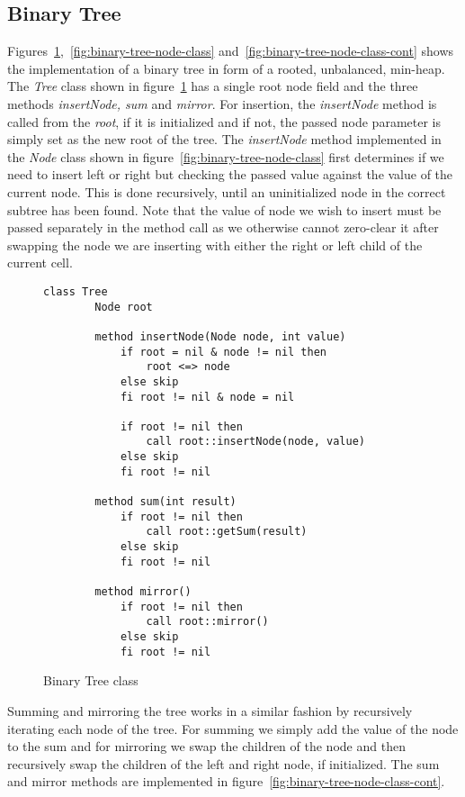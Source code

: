 \subsection{Binary Tree}
\label{subsec:binary-tree}
Figures~\ref{fig:binary-tree-class},~\ref{fig:binary-tree-node-class} and~\ref{fig:binary-tree-node-class-cont} shows the implementation of a binary tree in form of a  rooted, unbalanced, min-heap. The \textit{Tree} class shown in figure~\ref{fig:binary-tree-class} has a single root node field and the three methods \textit{insertNode, sum} and \textit{mirror}. For insertion, the \textit{insertNode} method is called from the \textit{root}, if it is initialized and if not, the passed node parameter is simply set as the new root of the tree. The \textit{insertNode} method implemented in the \textit{Node} class shown in figure~\ref{fig:binary-tree-node-class} first determines if we need to insert left or right but checking the passed value against the value of the current node. This is done recursively, until an uninitialized node in the correct subtree has been found. Note that the value of node we wish to insert must be passed separately in the method call as we otherwise cannot zero-clear it after swapping the node we are inserting with either the right or left child of the current cell.

\begin{figure}[ht!]
    \centering
    \begin{lstlisting}[style = basic, language = roopl] 
    class Tree
        Node root
        
        method insertNode(Node node, int value)
            if root = nil & node != nil then
                root <=> node
            else skip
            fi root != nil & node = nil
    
            if root != nil then
                call root::insertNode(node, value)
            else skip
            fi root != nil
    
        method sum(int result)
            if root != nil then
                call root::getSum(result)
            else skip
            fi root != nil
    
        method mirror()
            if root != nil then
                call root::mirror()
            else skip
            fi root != nil
    \end{lstlisting}
    \caption{Binary Tree class}
    \label{fig:binary-tree-class}
\end{figure}

Summing and mirroring the tree works in a similar fashion by recursively iterating each node of the tree. For summing we simply add the value of the node to the sum and for mirroring we swap the children of the node and then recursively swap the children of the left and right node, if initialized. The sum and mirror methods are implemented in figure~\ref{fig:binary-tree-node-class-cont}.

